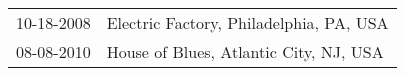 \begin{supertabular}{ll}
 10-18-2008 &  Electric Factory, Philadelphia, PA, USA \\
 08-08-2010 &   House of Blues, Atlantic City, NJ, USA \\
\end{supertabular}
